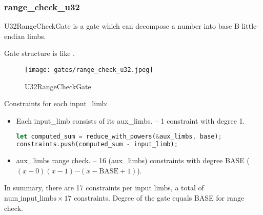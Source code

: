 \subsubsection{range\_check\_u32}

U32RangeCheckGate is a gate which can decompose a number into base B little-endian limbs.

Gate structure is like .

\begin{figure}[!ht]
    \centering
    \texttt{[image: gates/range\_check\_u32.jpeg]}
    \caption{U32RangeCheckGate}
    \label{fig:range-check-u32}
\end{figure}

Constraints for each input\_limb:
\begin{itemize}
    \item Each input\_limb consists of its aux\_limbs. -- 1 constraint with degree 1.
    \begin{lstlisting}[language=rust]
let computed_sum = reduce_with_powers(&aux_limbs, base);
constraints.push(computed_sum - input_limb);
    \end{lstlisting}
    \item aux\_limbs range check. -- 16 (aux\_limbs) constraints with degree BASE ($(x-0)(x-1)\cdots(x-\text{BASE}+1)$).
\end{itemize}

In summary, there are 17 constraints per input limbs, a total of $\text{num\_input\_limbs} \times 17$ constraints. 
Degree of the gate equals BASE for range check.

